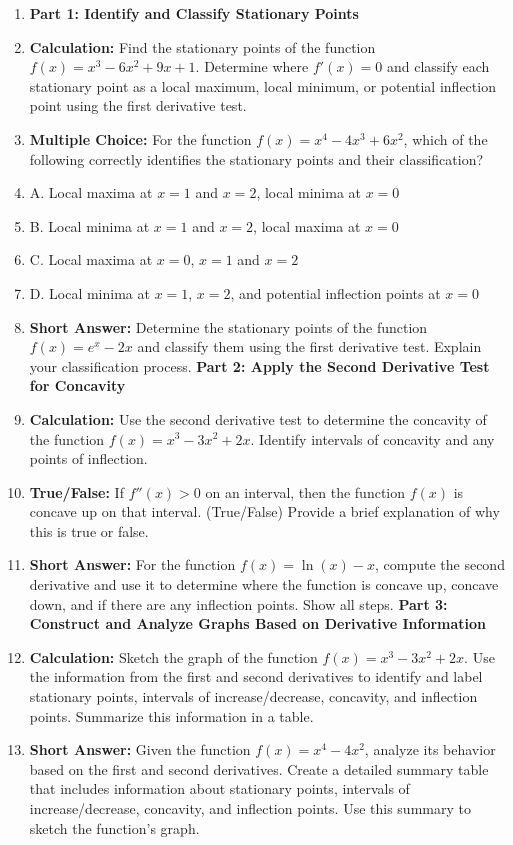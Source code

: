 \begin{enumerate}
    \item \textbf{Part 1: Identify and Classify Stationary Points}
    \item \textbf{Calculation:} Find the stationary points of the function $f(x) = x^3 - 6x^2 + 9x + 1$. Determine where $f'(x) = 0$ and classify each stationary point as a local maximum, local minimum, or potential inflection point using the first derivative test.
    \item \textbf{Multiple Choice:} For the function $f(x) = x^4 - 4x^3 + 6x^2$, which of the following correctly identifies the stationary points and their classification?
    \item A. Local maxima at $x = 1$ and $x = 2$, local minima at $x = 0$
    \item B. Local minima at $x = 1$ and $x = 2$, local maxima at $x = 0$
    \item C. Local maxima at $x = 0$, $x = 1$ and $x = 2$
    \item D. Local minima at $x = 1$, $x = 2$, and potential inflection points at $x = 0$
    \item \textbf{Short Answer:} Determine the stationary points of the function $f(x) = e^x - 2x$ and classify them using the first derivative test. Explain your classification process. \textbf{Part 2: Apply the Second Derivative Test for Concavity}
    \item \textbf{Calculation:} Use the second derivative test to determine the concavity of the function $f(x) = x^3 - 3x^2 + 2x$. Identify intervals of concavity and any points of inflection.
    \item \textbf{True/False:} If $f''(x) > 0$ on an interval, then the function $f(x)$ is concave up on that interval. (True/False) Provide a brief explanation of why this is true or false.
    \item \textbf{Short Answer:} For the function $f(x) = \ln(x) - x$, compute the second derivative and use it to determine where the function is concave up, concave down, and if there are any inflection points. Show all steps. \textbf{Part 3: Construct and Analyze Graphs Based on Derivative Information}
    \item \textbf{Calculation:} Sketch the graph of the function $f(x) = x^3 - 3x^2 + 2x$. Use the information from the first and second derivatives to identify and label stationary points, intervals of increase/decrease, concavity, and inflection points. Summarize this information in a table.
    \item \textbf{Short Answer:} Given the function $f(x) = x^4 - 4x^2$, analyze its behavior based on the first and second derivatives. Create a detailed summary table that includes information about stationary points, intervals of increase/decrease, concavity, and inflection points. Use this summary to sketch the function's graph.

\end{enumerate}

